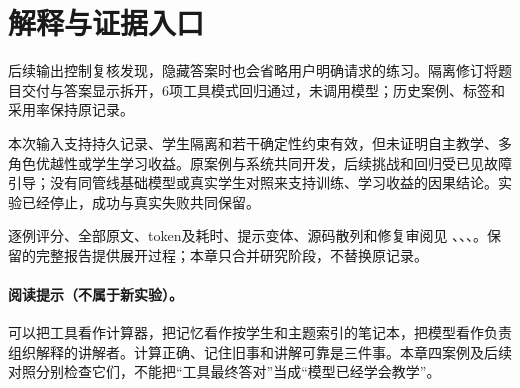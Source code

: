 \section{解释与证据入口}
后续输出控制复核发现，隐藏答案时也会省略用户明确请求的练习。隔离修订将题目交付与答案显示拆开，6项工具模式回归通过，未调用模型；历史案例、标签和采用率保持原记录。

本次输入支持持久记录、学生隔离和若干确定性约束有效，但未证明自主教学、多角色优越性或学生学习收益。原案例与系统共同开发，后续挑战和回归受已见故障引导；没有同管线基础模型或真实学生对照来支持训练、学习收益的因果结论。实验已经停止，成功与真实失败共同保留。

逐例评分、全部原文、token及耗时、提示变体、源码散列和修复审阅见 、、、。保留的完整报告提供展开过程；本章只合并研究阶段，不替换原记录。

\paragraph{阅读提示（不属于新实验）。}
可以把工具看作计算器，把记忆看作按学生和主题索引的笔记本，把模型看作负责组织解释的讲解者。计算正确、记住旧事和讲解可靠是三件事。本章四案例及后续对照分别检查它们，不能把“工具最终答对”当成“模型已经学会教学”。
